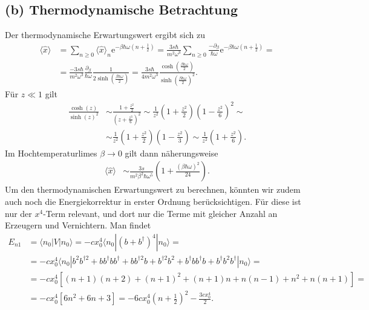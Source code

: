 \documentclass[english, parskip=full]{scrartcl}
\renewcommand{\bra}{}
\renewcommand{\braket}{}
\newcommand{\kla}{}
\newcommand{\klam}{}
\newcommand{\e}{\text{e}}
\begin{document}
\subsection*{(b) Thermodynamische Betrachtung}
Der thermodynamische Erwartungswert ergibt sich zu
\begin{align}
\bra\langle \hat{x} \rangle &= \sum_{n\ge 0} \bra\langle \hat{x} \rangle_n \e^{-\beta\hbar\omega \kla\left( n+\frac{1}{2} \right)} = \frac{3s\hbar}{m^2\omega^3} \sum_{n\ge 0} \frac{-\partial_\beta}{\hbar\omega} \e^{-\beta\hbar\omega\kla\left( n+\frac{1}{2} \right)} = \\
&= \frac{-3s\hbar}{m^2\omega^3} \frac{\partial_\beta}{\hbar\omega} \frac{1}{2\sinh\kla\left( \frac{\beta\hbar\omega}{2} \right)} = \frac{3s\hbar}{4m^2\omega^3} \frac{\cosh\kla\left( \frac{\beta\hbar\omega}{2} \right)}{\sinh\kla\left( \frac{\beta\hbar\omega}{2} \right)^2}.
\end{align}
Für $z\ll 1$ gilt
\begin{align}
\frac{\cosh(z)}{\sinh(z)^2} &\sim \frac{1 + \frac{z^2}{2}}{\kla\left( z + \frac{z^3}{6} \right)^2} \sim \frac{1}{z^2}\kla\left( 1 + \frac{z^2}{2} \right) \kla\left( 1 - \frac{z^2}{6} \right)^2 \sim\\
&\sim \frac{1}{z^2} \kla\left( 1 + \frac{z^2}{2} \right) \kla\left( 1 - \frac{z^2}{3} \right) \sim \frac{1}{z^2} \kla\left( 1 + \frac{z^2}{6} \right).
\end{align}
Im Hochtemperaturlimes $\beta\rightarrow 0$ gilt dann näherungsweise
\begin{align}
\bra\langle \hat{x} \rangle &\sim \frac{3s}{m^2\beta^2 \hbar\omega^5}  \kla\left( 1 + \frac{(\beta\hbar\omega)^2}{24} \right).
\end{align}
Um den thermodynamischen Erwartungswert zu berechnen, könnten wir zudem auch noch die Energiekorrektur in erster Ordnung berücksichtigen.
Für diese ist nur der $x^4$-Term relevant, und dort nur die Terme mit gleicher Anzahl an Erzeugern und Vernichtern.
Man findet
\begin{align}
E_{n1} &= \braket\langle n_0 | V | n_0 \rangle = -cx_0^4 \braket\langle n_0 | (b+b^\dagger)^4 | n_0 \rangle = \\
&= -cx_0^4 \braket\langle n_0 | b^2b^{\dagger 2} + bb^\dagger bb^\dagger + bb^{\dagger 2}b + b^{\dagger 2} b^2 + b^\dagger bb^\dagger b + b^\dagger b^2 b^\dagger | n_0 \rangle = \\
&= -cx_0^4 \klam\left[ (n+1)(n+2) + (n+1)^2 + (n+1)n + n(n-1) + n^2 + n(n+1) \right] = \\
&= -cx_0^4 \klam\left[ 6n^2 + 6n + 3 \right] = -6cx_0^4 \kla\left( n+\frac{1}{2} \right)^2 - \frac{3cx_0^4}{2}.
\end{align}
\end{document}
